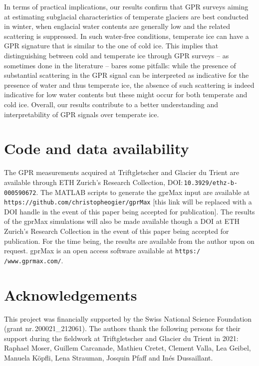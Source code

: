 In terms of practical implications, our results confirm that GPR surveys aiming at estimating subglacial characteristics of temperate glaciers are best conducted in winter, when englacial water contents are generally low and the related scattering is suppressed. In such water-free conditions, temperate ice can have a GPR signature that is similar to the one of cold ice. This implies that distinguishing between cold and temperate ice through GPR surveys -- as sometimes done in the literature -- bares some pitfalls: while the presence of substantial scattering in the GPR signal can be interpreted as indicative for the presence of water and thus temperate ice, the absence of such scattering is indeed indicative for low water contents but these might occur for both temperate and cold ice. Overall, our results contribute to a better understanding and interpretability of GPR signals over temperate ice.


\section{Code and data availability}

The GPR measurements acquired at Triftgletscher and Glacier du Trient are available through ETH Zurich's Research Collection, DOI:\,\texttt{10.3929/ethz-b-000590672}.
The MATLAB scripts to generate the gprMax input are available at \texttt{https:/$\!$/github.com/christopheogier/gprMax} [this link will be replaced with a DOI handle in the event of this paper being accepted for publication]. The results of the gprMax simulations will also be made available though a DOI at ETH Zurich's Research Collection in the event of this paper being accepted for publication. For the time being, the results are available from the author upon on request. gprMax is an open access software available at \texttt{https:/$\!$/www.gprmax.com/}. 


\section{Acknowledgements} 

This project was financially supported by the Swiss National Science Foundation (grant nr.\,200021\_212061).
The authors thank the following persons for their support during the fieldwork at Triftgletscher and Glacier du Trient in 2021: Raphael Moser, Guillem Carcanade, Mathieu Cretet, Clement Valla, Lea Geibel, Manuela Köpfli, Lena Strauman, Josquin Pfaff and Inés Dussaillant.
